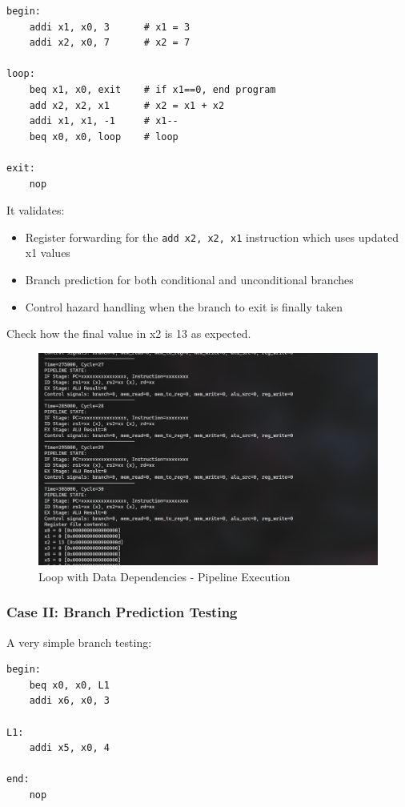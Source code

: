\documentclass{article}
\numberwithin{figure}{section}
\numberwithin{table}{section}
\begin{document}
\begin{lstlisting}[style=verilog-style]
begin:
    addi x1, x0, 3      # x1 = 3
    addi x2, x0, 7      # x2 = 7

loop:
    beq x1, x0, exit    # if x1==0, end program
    add x2, x2, x1      # x2 = x1 + x2
    addi x1, x1, -1     # x1--
    beq x0, x0, loop    # loop

exit:
    nop
\end{lstlisting}
It validates:
\begin{itemize}
    \item Register forwarding for the \texttt{add x2, x2, x1} instruction which uses updated x1 values
    \item Branch prediction for both conditional and unconditional branches
    \item Control hazard handling when the branch to exit is finally taken
\end{itemize}

Check how the final value in x2 is 13 as expected.

\begin{figure}[H]
    \centering
    \includegraphics[width=0.95\linewidth]{pipe_test2.png}
    \caption{Loop with Data Dependencies - Pipeline Execution}
    \label{fig:pipe-test2}
\end{figure}






\subsubsection{Case II: Branch Prediction Testing}

A very simple branch testing:

\begin{lstlisting}[style=verilog-style]
begin:
    beq x0, x0, L1
    addi x6, x0, 3

L1:
    addi x5, x0, 4

end:
    nop
\end{lstlisting}
\end{document}
